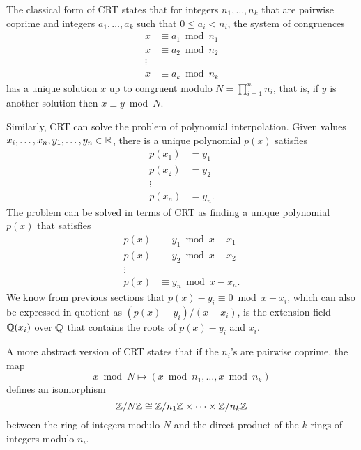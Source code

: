 \documentclass[../main.tex]{subfiles}
\begin{document}
The classical form of CRT states that for integers $n_1, \dots, n_k$ that are pairwise 
\reversemarginpar
{}
coprime and integers $a_1, \dots, a_k$ such that $0 \le a_i < n_i$, the system of congruences 
\begin{align*}
    x &\equiv a_1 \bmod n_1 \\
    x &\equiv a_2 \bmod n_2 \\
    \vdots \\
    x &\equiv a_k \bmod n_k
\end{align*}
has a unique solution $x$ up to congruent modulo $N = \prod_{i=1}^n n_i$, that is, if $y$ is another solution then $x \equiv y \bmod N$.

Similarly, CRT can solve the problem of polynomial interpolation. Given values $x_i, \dots, x_n, y_1, \dots, y_n \in \mathbb{R}$, there is a unique polynomial $p(x)$ satisfies 
\begin{align*}
    p(x_1) &=y_1 \\
    p(x_2) &= y_2 \\
    \vdots \\
    p(x_n) &= y_n.
\end{align*}
The problem can be solved in terms of CRT as finding a unique polynomial $p(x)$ that satisfies 
\begin{align*}
    p(x) & \equiv y_1 \bmod x-x_1\\
    p(x) &\equiv y_2  \bmod x-x_2\\
    \vdots \\
    p(x) &\equiv y_n  \bmod x-x_n.
\end{align*}
We know from previous sections that $p(x) -y_i\equiv 0 \bmod x-x_i$, which can also be expressed in quotient as $(p(x)-y_i) / (x-x_i)$, is the  extension field $\mathbb{Q}(x_i)$ over $\mathbb{Q}$ that contains the roots of $p(x) -y_i$ and $x_i$. %

A more abstract version of CRT states that if the $n_i$'s are pairwise coprime, the map 
\reversemarginpar
{}
\begin{equation*}
    x \bmod N \mapsto (x \bmod n_1, \dots, x\bmod n_k)
\end{equation*}
defines an isomorphism 
\begin{equation*}
    \mathbb{Z} / N\mathbb{Z} \cong \mathbb{Z} / n_1 \mathbb{Z} \times \cdots \times \mathbb{Z} / n_k \mathbb{Z}
\end{equation*}
between the ring of integers modulo $N$ and the direct product of the $k$ rings of integers modulo $n_i$. 
\end{document}
